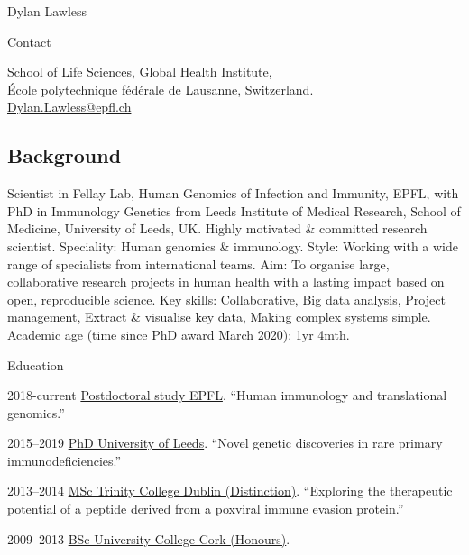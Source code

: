 \documentclass[12pt,a4paper]{article}
\begin{document}
\begin{cv}{Dylan Lawless} 
  \begin{cvlist}{Contact}
  \item School of Life Sciences, Global Health Institute, \\
    École polytechnique fédérale de Lausanne,
    Switzerland. \\
    \href{mailto:Dylan.Lawless@epfl.ch}{Dylan.Lawless@epfl.ch}\\
  \end{cvlist}

\subsection*{Background}
Scientist in Fellay Lab, Human Genomics of Infection and Immunity, EPFL, with PhD in Immunology Genetics from Leeds Institute of Medical Research, School of Medicine, University of Leeds, UK.
 Highly motivated \& committed research scientist. Speciality: Human genomics \& immunology. 
Style: Working with a wide range of specialists from international teams.
 Aim: To organise large, collaborative research projects in human health with a lasting impact based on open, reproducible science. 
Key skills: Collaborative, Big data analysis, Project management, Extract \& visualise key data, Making complex systems simple.
Academic age (time since PhD award March 2020): 1yr 4mth.


\begin{cvlist}{Education}
  \item[2018-current] \href{https://fellay-lab.epfl.ch}{Postdoctoral study EPFL}. ``Human immunology and translational genomics.''
  \item[2015--2019] \href{https://medicinehealth.leeds.ac.uk/medicine}{PhD University of Leeds}. ``Novel genetic discoveries in rare primary immunodeficiencies.''
  \item[2013--2014] \href{https://www.tcd.ie/biosciences/}{MSc Trinity College Dublin (Distinction)}. ``Exploring the therapeutic potential of a peptide derived from a poxviral immune evasion protein.''
  \item[2009--2013] \href{https://www.ucc.ie/en/}{BSc University College Cork (Honours)}.
  \end{cvlist}
  

\end{cv}
\end{document}
